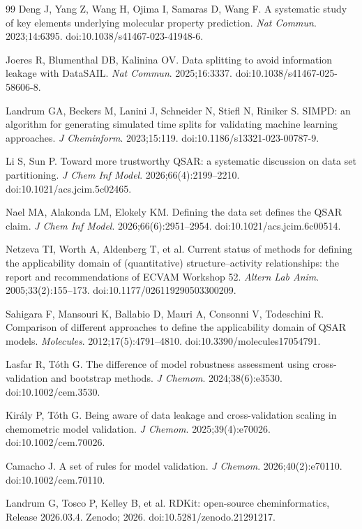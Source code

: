 \begin{thebibliography}{99}
Deng J, Yang Z, Wang H, Ojima I, Samaras D, Wang F. A systematic study of key elements underlying molecular property prediction. \textit{Nat Commun}. 2023;14:6395. doi:10.1038/s41467-023-41948-6.

Joeres R, Blumenthal DB, Kalinina OV. Data splitting to avoid information leakage with DataSAIL. \textit{Nat Commun}. 2025;16:3337. doi:10.1038/s41467-025-58606-8.

Landrum GA, Beckers M, Lanini J, Schneider N, Stiefl N, Riniker S. SIMPD: an algorithm for generating simulated time splits for validating machine learning approaches. \textit{J Cheminform}. 2023;15:119. doi:10.1186/s13321-023-00787-9.

Li S, Sun P. Toward more trustworthy QSAR: a systematic discussion on data set partitioning. \textit{J Chem Inf Model}. 2026;66(4):2199--2210. doi:10.1021/acs.jcim.5c02465.

Nael MA, Alakonda LM, Elokely KM. Defining the data set defines the QSAR claim. \textit{J Chem Inf Model}. 2026;66(6):2951--2954. doi:10.1021/acs.jcim.6c00514.

Netzeva TI, Worth A, Aldenberg T, et al. Current status of methods for defining the applicability domain of (quantitative) structure--activity relationships: the report and recommendations of ECVAM Workshop 52. \textit{Altern Lab Anim}. 2005;33(2):155--173. doi:10.1177/026119290503300209.

Sahigara F, Mansouri K, Ballabio D, Mauri A, Consonni V, Todeschini R. Comparison of different approaches to define the applicability domain of QSAR models. \textit{Molecules}. 2012;17(5):4791--4810. doi:10.3390/molecules17054791.

Lasfar R, T\'oth G. The difference of model robustness assessment using cross-validation and bootstrap methods. \textit{J Chemom}. 2024;38(6):e3530. doi:10.1002/cem.3530.

Kir\'aly P, T\'oth G. Being aware of data leakage and cross-validation scaling in chemometric model validation. \textit{J Chemom}. 2025;39(4):e70026. doi:10.1002/cem.70026.

Camacho J. A set of rules for model validation. \textit{J Chemom}. 2026;40(2):e70110. doi:10.1002/cem.70110.

Landrum G, Tosco P, Kelley B, et al. RDKit: open-source cheminformatics, Release 2026.03.4. Zenodo; 2026. doi:10.5281/zenodo.21291217.


\end{thebibliography}
